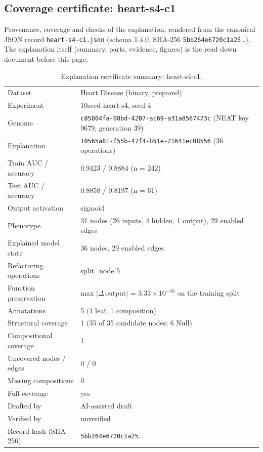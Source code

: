 \providecommand{\explaneatcertdir}[1]{}
\begin{drafted}
\section{Coverage certificate: heart-s4-c1}\label{app:heart-s4-c1:sec}
Provenance, coverage and checks of the explanation, rendered from the canonical JSON record \texttt{heart-s4-c1.json} (schema 1.4.0, SHA-256 \texttt{5bb264e6720c1a25}\ldots). The explanation itself (summary, parts, evidence, figures) is the read-down document before this page.

\begin{table}[htbp]
\centering\small
\begin{tabularx}{\linewidth}{@{}lX@{}}
\toprule
Dataset & Heart Disease (binary, prepared) \\
Experiment & 10seed-heart-s4, seed 4 \\
Genome & \texttt{c85804fa-08bd-4207-ac69-a31a8567473c} (NEAT key 9679, generation 39) \\
Explanation & \texttt{10565a81-f55b-47f4-b51e-21641ec08556} (36 operations) \\
Train AUC / accuracy & 0.9423 / 0.8884 (n = 242) \\
Test AUC / accuracy & 0.8858 / 0.8197 (n = 61) \\
Output activation & sigmoid \\
Phenotype & 31 nodes (26 inputs, 4 hidden, 1 output), 29 enabled edges \\
Explained model state & 36 nodes, 29 enabled edges \\
Refactoring operations & split\_\allowbreak{}node 5 \\
Function preservation & max $|\Delta\,\mathrm{output}|$ = $3.33\times 10^{-16}$ on the training split \\
Annotations & 5 (4 leaf, 1 composition) \\
Structural coverage & 1 (35 of 35 candidate nodes; 6 Null) \\
Compositional coverage & 1 \\
Uncovered nodes / edges & 0 / 0 \\
Missing compositions & 0 \\
Full coverage & yes \\
Drafted by & AI-assisted draft \\
Verified by & unverified \\
Record hash (SHA-256) & \texttt{5bb264e6720c1a25}\ldots \\
\bottomrule
\end{tabularx}
\caption{Explanation certificate summary: heart-s4-c1.}
\label{app:heart-s4-c1:summary}
\end{table}

\end{drafted}

